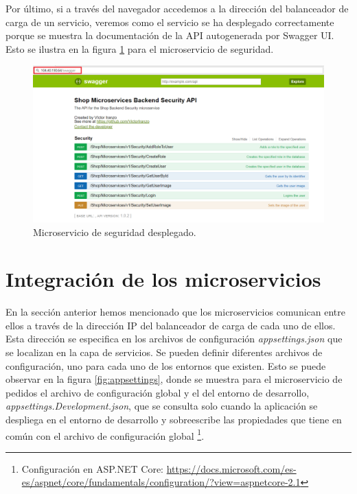 \documentclass[11pt,spanish,listoffigures]{tfgetsinf}
\begin{document}
Por último, si a través del navegador accedemos a la dirección del balanceador de carga de un servicio, veremos como el servicio se ha desplegado correctamente porque se muestra la documentación de la API autogenerada por Swagger UI. Esto se ilustra en la figura \ref{fig:MicroservicioDesplegado} para el microservicio de seguridad.

\begin{figure}[h]
\centering
\includegraphics[scale=0.5]{MicroservicioDesplegado} 
\caption{Microservicio de seguridad desplegado.}
\label{fig:MicroservicioDesplegado}
\end{figure}

\newpage

\section{Integración de los microservicios}

En la sección anterior hemos mencionado que los microservicios comunican entre ellos a través de la dirección IP del balanceador de carga de cada uno de ellos. Esta dirección se especifica en los archivos de configuración \textit{appsettings.json} que se localizan en la capa de servicios. Se pueden definir diferentes archivos de configuración, uno para cada uno de los entornos que existen. Esto se puede observar en la figura \ref{fig:appsettings}, donde se muestra para el microservicio de pedidos el archivo de configuración global y el del entorno de desarrollo, \textit{appsettings.Development.json}, que se consulta solo cuando la aplicación se despliega en el entorno de desarrollo y sobreescribe las propiedades que tiene en común con el archivo de configuración global \footnote{ Configuración en ASP.NET Core: \url{https://docs.microsoft.com/es-es/aspnet/core/fundamentals/configuration/?view=aspnetcore-2.1}}.
\end{document}
